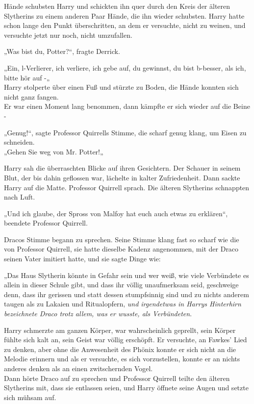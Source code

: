 {Hände schubsten Harry und schickten ihn quer durch den Kreis der älteren Slytherins zu einem anderen Paar Hände, die ihn wieder schubsten. Harry hatte schon lange den Punkt überschritten, an dem er versuchte, nicht zu weinen, und versuchte jetzt nur noch, nicht umzufallen.

„Was bist du, Potter?“, fragte Derrick.

„Ein, l-Verlierer, ich verliere, ich gebe auf, du gewinnst, du bist b-besser, als ich, bitte hör auf -„\\ Harry stolperte über einen Fuß und stürzte zu Boden, die Hände konnten sich nicht ganz fangen.\\ Er war einen Moment lang benommen, dann kämpfte er sich wieder auf die Beine -

„Genug!“, sagte Professor Quirrells Stimme, die scharf genug klang, um Eisen zu schneiden.\\ „Gehen Sie weg von Mr. Potter!„

Harry sah die überraschten Blicke auf ihren Gesichtern. Der Schauer in seinem Blut, der bis dahin geflossen war, lächelte in kalter Zufriedenheit. Dann sackte Harry auf die Matte. Professor Quirrell sprach. Die älteren Slytherins schnappten nach Luft.

„Und ich glaube, der Spross von Malfoy hat euch auch etwas zu erklären“, beendete Professor Quirrell.

Dracos Stimme begann zu sprechen. Seine Stimme klang fast so scharf wie die von Professor Quirrell, sie hatte dieselbe Kadenz angenommen, mit der Draco seinen Vater imitiert hatte, und sie sagte Dinge wie:

„Das Haus Slytherin könnte in Gefahr sein und wer weiß, wie viele Verbündete es allein in dieser Schule gibt, und dass ihr völlig unaufmerksam seid, geschweige denn, dass ihr gerissen und statt dessen stumpfsinnig sind und zu nichts anderem taugen als zu Lakaien und Ritualopfern, \emph{und irgendetwas in Harrys Hinterhirn bezeichnete Draco trotz allem, was er wusste, als Verbündeten}.

Harry schmerzte am ganzen Körper, war wahrscheinlich geprellt, sein Körper fühlte sich kalt an, sein Geist war völlig erschöpft. Er versuchte, an Fawkes' Lied zu denken, aber ohne die Anwesenheit des Phönix konnte er sich nicht an die Melodie erinnern und als er versuchte, es sich vorzustellen, konnte er an nichts anderes denken als an einen zwitschernden Vogel.\\ Dann hörte Draco auf zu sprechen und Professor Quirrell teilte den älteren Slytherins mit, dass sie entlassen seien, und Harry öffnete seine Augen und setzte sich mühsam auf.

}
